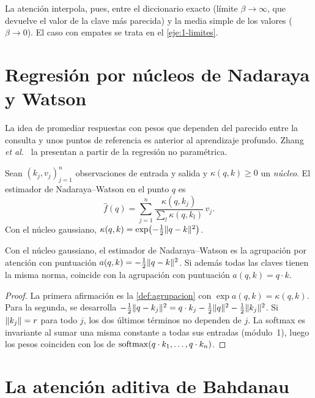 La atención interpola, pues, entre el diccionario exacto (límite $\beta\to\infty$, que devuelve el valor de la clave más parecida) y la media simple de los valores ($\beta\to 0$). El caso con empates se trata en el \cref{eje:1-limites}.

\section{Regresión por núcleos de Nadaraya y Watson}

La idea de promediar respuestas con pesos que dependen del parecido entre la consulta y unos puntos de referencia es anterior al aprendizaje profundo. Zhang \emph{et al.}~\cite[§11.2]{d2l} la presentan a partir de la regresión no paramétrica.

\begin{definicion}\label{def:nw}
Sean $(k_j,v_j)_{j=1}^{n}$ observaciones de entrada y salida y $\kappa(q,k)\ge 0$ un \emph{núcleo}. El estimador de Nadaraya--Watson en el punto $q$ es
\[
\hat f(q)=\sum_{j=1}^{n}\frac{\kappa(q,k_j)}{\sum_{l}\kappa(q,k_l)}\,v_j .
\]
Con el núcleo gaussiano, $\kappa(q,k)=\exp\bigl(-\tfrac12\lVert q-k\rVert^{2}\bigr)$.
\end{definicion}

\begin{proposicion}\label{prop:gauss}
Con el núcleo gaussiano, el estimador de Nadaraya--Watson es la agrupación por atención con puntuación $a(q,k)=-\tfrac12\lVert q-k\rVert^{2}$. Si además todas las claves tienen la misma norma, coincide con la agrupación con puntuación $a(q,k)=q\cdot k$.
\end{proposicion}

\begin{proof}
La primera afirmación es la \cref{def:agrupacion} con $\exp a(q,k)=\kappa(q,k)$. Para la segunda, se desarrolla $-\tfrac12\lVert q-k_j\rVert^{2}=q\cdot k_j-\tfrac12\lVert q\rVert^{2}-\tfrac12\lVert k_j\rVert^{2}$. Si $\lVert k_j\rVert=r$ para todo $j$, los dos últimos términos no dependen de $j$. La softmax es invariante al sumar una misma constante a todas sus entradas (módulo~1), luego los pesos coinciden con los de $\operatorname{softmax}(q\cdot k_1,\dots,q\cdot k_n)$.
\end{proof}

\section{La atención aditiva de Bahdanau}
\label{sec:bahdanau}

